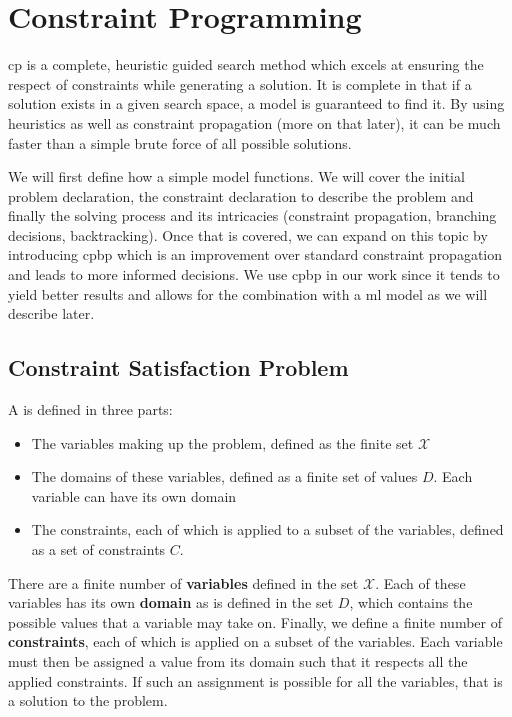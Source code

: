 \documentclass[../Document.tex]{subfiles}
\begin{document}
\section{Constraint Programming}
\label{sec:intro/cp}
\acrlong{cp} is a complete, heuristic guided search method which excels at ensuring the respect of constraints while generating a solution. It is complete in that if a solution exists in a given search space, a \cp model is guaranteed to find it. By using heuristics as well as constraint propagation (more on that later), it can be much faster than a simple brute force of all possible solutions.

We will first define how a simple \cp model functions. We will cover the initial problem declaration, the constraint declaration to describe the problem and finally the solving process and its intricacies (constraint propagation, branching decisions, backtracking).
Once that is covered, we can expand on this topic by introducing \gls{cpbp}
which is an improvement over standard constraint propagation and leads to more informed decisions. We use \gls{cpbp} in our work since it tends to yield better results and allows for the combination with a \gls{ml} model as we will describe later.

\subsection{Constraint Satisfaction Problem}
A \csp is defined in three parts:
\begin{itemize}
    \item The variables making up the problem, defined as the finite set $\mathcal{X}$
    \item The domains of these variables, defined as a finite set of values $D$. Each variable can have its own domain
    \item The constraints, each of which is applied to a subset of the variables, defined as a set of constraints $C$.
\end{itemize}

There are a finite number of \textbf{variables} defined in the set $\mathcal{X}$. Each of these variables has its own \textbf{domain} as is defined in the set $D$, which contains the possible values that a variable may take on. Finally, we define a finite number of \textbf{constraints}, each of which is applied on a subset of the variables. Each variable must then be assigned a value from its domain such that it respects all the applied constraints. If such an assignment is possible for all the variables, that is a solution to the problem.
\end{document}
